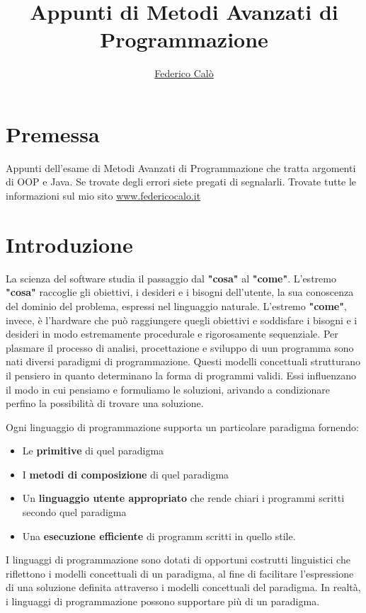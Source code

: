 \documentclass[a4paper,18pt]{extarticle}
\title{Appunti di Metodi Avanzati di Programmazione}
\author{\href{http://www.federicocalo.it}{Federico Calò} }
\date{}
\begin{document}
\maketitle

\newpage

\tableofcontents

\newpage
\section{ Premessa}
Appunti dell'esame di Metodi Avanzati di Programmazione che tratta argomenti di OOP e Java. Se trovate degli errori siete pregati di segnalarli. Trovate tutte le informazioni sul mio sito \href{http://www.federicocalo.it}{www.federicocalo.it}

\newpage
\section{ Introduzione}

La scienza del software studia il passaggio dal \textbf{"cosa"} al \textbf{"come"}. L'estremo \textbf{"cosa"} raccoglie gli obiettivi, i desideri e i bisogni dell'utente, la sua conoscenza del dominio del problema, espressi nel linguaggio naturale. L'estremo \textbf{"come"}, invece, è l'hardware che può raggiungere quegli obiettivi e soddisfare i bisogni e i desideri in modo estremamente procedurale e rigorosamente sequenziale. Per plasmare il processo di analisi, procettazione e sviluppo di uun programma sono nati diversi paradigmi di programmazione. Questi modelli concettuali strutturano il pensiero in quanto determinano la forma di programmi validi. Essi influenzano il modo in cui pensiamo e formuliamo le soluzioni, arivando a condizionare perfino la possibilità di trovare una soluzione.

Ogni linguaggio di programmazione supporta un particolare paradigma fornendo:

\begin{itemize}
  \item Le \textbf{primitive} di quel paradigma
  \item I \textbf{metodi di composizione} di quel paradigma
  \item Un \textbf{linguaggio utente appropriato} che rende chiari i programmi scritti secondo quel paradigma
  \item Una \textbf{esecuzione efficiente} di programm scritti in quello stile.
\end{itemize}

I linguaggi di programmazione sono dotati di opportuni costrutti linguistici che riflettono i modelli concettuali di un paradigma, al fine di facilitare l'espressione di una soluzione definita attraverso i modelli concettuali del paradigma. In realtà, i linguaggi di programmazione possono supportare più di un paradigma.
\end{document}
